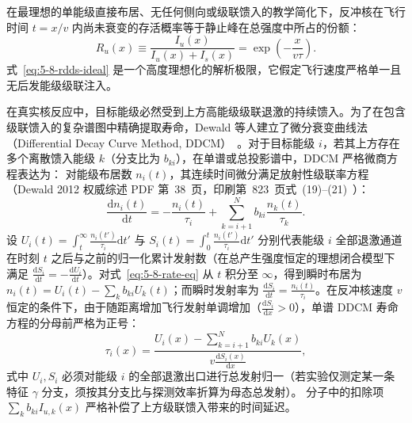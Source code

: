 在最理想的单能级直接布居、无任何侧向或级联馈入的教学简化下，反冲核在飞行时间 $t = x/v$ 内尚未衰变的存活概率等于静止峰在总强度中所占的份额：
\begin{equation}\label{eq:5-8-rdds-ideal}
R_u(x) \equiv \frac{I_u(x)}{I_u(x) + I_s(x)} = \exp\left( - \frac{x}{v \tau} \right).
\end{equation}
式~\eqref{eq:5-8-rdds-ideal} 是一个高度理想化的解析极限，它假定飞行速度严格单一且无后发能级级联注入。

在真实核反应中，目标能级必然受到上方高能级级联退激的持续馈入。为了在包含级联馈入的复杂谱图中精确提取寿命，Dewald 等人建立了微分衰变曲线法（Differential Decay Curve Method, DDCM）~\cite{dewald-2012-ddcm-recoil-distance}。对于目标能级 $i$，若其上方存在多个离散馈入能级 $k$（分支比为 $b_{ki}$），在单谱或总投影谱中，DDCM 严格微商方程表达为：
对能级布居数 $n_i(t)$，其连续时间微分满足放射性级联率方程（Dewald 2012 权威综述 PDF 第~38~页，印刷第~823~页式~(19)–(21)~\cite{dewald-2012-ddcm-recoil-distance}）：
\begin{equation}\label{eq:5-8-rate-eq}
\frac{\mathrm{d}n_i(t)}{\mathrm{d}t} = -\frac{n_i(t)}{\tau_i} + \sum_{k=i+1}^N b_{ki} \frac{n_k(t)}{\tau_k}.
\end{equation}
设 $U_i(t) = \int_t^\infty \frac{n_i(t')}{\tau_i} \mathrm{d}t'$ 与 $S_i(t) = \int_0^t \frac{n_i(t')}{\tau_i} \mathrm{d}t'$ 分别代表能级 $i$ 全部退激通道在时刻 $t$ 之后与之前的归一化累计发射数（在总产生强度恒定的理想闭合模型下满足 $\frac{\mathrm{d}S_i}{\mathrm{d}t} = -\frac{\mathrm{d}U_i}{\mathrm{d}t}$）。对式~\eqref{eq:5-8-rate-eq} 从 $t$ 积分至 $\infty$，得到瞬时布居为 $n_i(t) = U_i(t) - \sum_k b_{ki} U_k(t)$；而瞬时发射率为 $\frac{\mathrm{d}S_i}{\mathrm{d}t} = \frac{n_i(t)}{\tau_i}$。在反冲核速度 $v$ 恒定的条件下，由于随距离增加飞行发射单调增加（$\frac{\mathrm{d}S_i}{\mathrm{d}x} > 0$），单谱 DDCM 寿命方程的分母前严格为正号：
\begin{equation}\label{eq:5-8-ddcm-singles}
\tau_i(x) = \frac{U_i(x) - \sum_{k=i+1}^N b_{ki} U_k(x)}{v \frac{\mathrm{d} S_i(x)}{\mathrm{d}x}},
\end{equation}
式中 $U_i, S_i$ 必须对能级 $i$ 的全部退激出口进行总发射归一（若实验仅测定某一条特征 $\gamma$ 分支，须按其分支比与探测效率折算为母态总发射）。
分子中的扣除项 $\sum_k b_{ki} I_{u, k}(x)$ 严格补偿了上方级联馈入带来的时间延迟。

